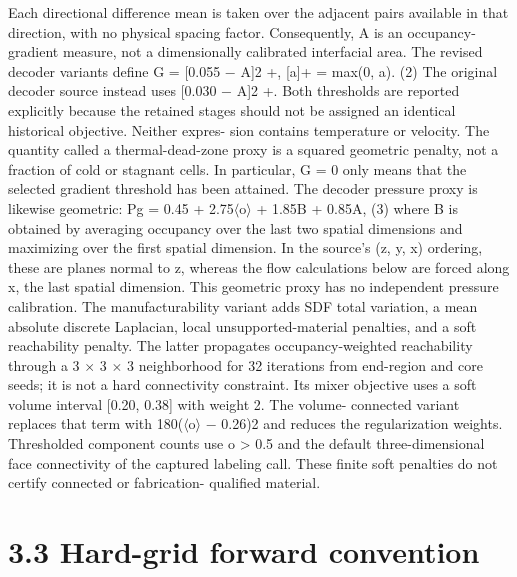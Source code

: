 \documentclass[11pt]{article}
\begin{document}
Each directional difference mean is taken over the adjacent pairs available in that direction, with
no physical spacing factor. Consequently, A is an occupancy-gradient measure, not a dimensionally
calibrated interfacial area. The revised decoder variants define
G = [0.055 \ensuremath{-} A]2
+, [a]+ = max(0, a). (2)
The original decoder source instead uses [0.030 \ensuremath{-} A]2
+. Both thresholds are reported explicitly
because the retained stages should not be assigned an identical historical objective. Neither expres-
sion contains temperature or velocity. The quantity called a thermal-dead-zone proxy is a squared
geometric penalty, not a fraction of cold or stagnant cells. In particular, G = 0 only means that
the selected gradient threshold has been attained.
The decoder pressure proxy is likewise geometric:
Pg = 0.45 + 2.75\ensuremath{\langle}o\ensuremath{\rangle} + 1.85B + 0.85A, (3)
where B is obtained by averaging occupancy over the last two spatial dimensions and maximizing
over the first spatial dimension. In the source’s (z, y, x) ordering, these are planes normal to z,
whereas the flow calculations below are forced along x, the last spatial dimension. This geometric
proxy has no independent pressure calibration. The manufacturability variant adds SDF total
variation, a mean absolute discrete Laplacian, local unsupported-material penalties, and a soft
reachability penalty. The latter propagates occupancy-weighted reachability through a 3 \ensuremath{\times} 3 \ensuremath{\times}
3 neighborhood for 32 iterations from end-region and core seeds; it is not a hard connectivity
constraint. Its mixer objective uses a soft volume interval [0.20, 0.38] with weight 2. The volume-
connected variant replaces that term with 180(\ensuremath{\langle}o\ensuremath{\rangle} \ensuremath{-} 0.26)2 and reduces the regularization weights.
Thresholded component counts use o > 0.5 and the default three-dimensional face connectivity
of the captured labeling call. These finite soft penalties do not certify connected or fabrication-
qualified material.

\section*{3.3 Hard-grid forward convention}
\end{document}
